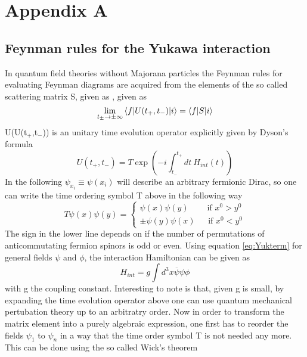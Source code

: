 \appendix
\chapter{Appendix A}
\section{Feynman rules for the Yukawa interaction}
In quantum field theories without Majorana particles the Feynman rules for evaluating Feynman diagrams are acquired from the elements of the so called scattering matrix S, given as \cite[Eq. 3.26]{Tong:2006}, given as
\begin{equation}
\lim\limits_{t_\pm\rightarrow\pm\infty}\braket{f|U(t_+,t_-)|i}=\braket{f|S|i}
\label{eq:s-matrix}
\end{equation}
U(U(t$_+$,t$_-$)) is an unitary time evolution operator explicitly given by Dyson's formula
\begin{equation*}
	U(t_+,t_-)=T\exp\left(-i\int_{t_-}^{t_+}dt\:H_{int}(t)\right)
\end{equation*}
In the following $\psi_{x_i}\equiv\psi(x_i)$ will describe an arbitrary fermionic Dirac, so one can write the time ordering symbol T above in the following way
\begin{equation*}
	T\psi(x)\psi(y)=\left\{\begin{array}{c}\psi(x)\psi(y)\:\:\:\:\:\:\:\:\:\:\text{if } x^0>y^0\\\pm\psi(y)\psi(x)\:\:\:\:\:\:\:\text{if }x^0<y^0\end{array}\right.
	\end{equation*}
The sign in the lower line depends on if the number of permutations of anticommutating fermion spinors is odd or even. \newline
Using equation \ref{eq:Yukterm} for general fields $\psi$ and $\phi$, the interaction Hamiltonian can be given as
\begin{equation*}
	H_{int}=g\int d^3x \overline{\psi}\psi\phi
\end{equation*}
with g the coupling constant.\newline
Interesting to note is that, given g is small, by expanding the time evolution operator above one can use quantum mechanical pertubation theory up to an arbitratry order. \newline
Now in order to transform the matrix element into a purely algebraic expression, one first has to reorder the fields $\psi_1$ to $\psi_n$ in a way that the time order symbol T is not needed any more. This can be done using the so called Wick's theorem
